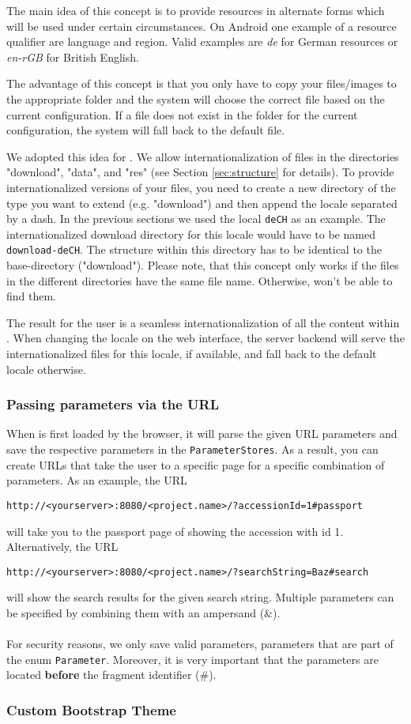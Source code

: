 The main idea of this concept is to provide resources in alternate forms which will be used under certain circumstances. On Android one example of a resource qualifier are language and region. Valid examples are \textit{de} for German resources or \textit{en-rGB} for British English.

The advantage of this concept is that you only have to copy your files/images to the appropriate folder and the system will choose the correct file based on the current configuration. If a file does not exist in the folder for the current configuration, the system will fall back to the default file.

We adopted this idea for {\germinate}. We allow internationalization of files in the directories "download", "data", and "res" (see Section \ref{sec:structure} for details). To provide internationalized versions of your files, you need to create a new directory of the type you want to extend (e.g. "download") and then append the locale separated by a dash. In the previous sections we used the local \texttt{de\textunderscore CH} as an example. The internationalized download directory for this locale would have to be named \texttt{download-de\textunderscore CH}. The structure within this directory has to be identical to the base-directory ("download"). Please note, that this concept only works if the files in the different directories have the same file name. Otherwise, {\germinate} won't be able to find them.

The result for the user is a seamless internationalization of all the content within {\germinate}. When changing the locale on the web interface, the server backend will serve the internationalized files for this locale, if available, and fall back to the default locale otherwise. 

\subsubsection{Passing parameters via the URL}
When {\germinate} is first loaded by the browser, it will parse the given URL parameters and save the respective parameters in the \texttt{ParameterStores}. As a result, you can create URLs that take the user to a specific page for a specific combination of parameters. As an example, the URL
\begin{center}
\texttt{http://<your\textunderscore server>:8080/<project.name>/?accessionId=1\#passport}
\end{center}
will take you to the passport page of {\germinate} showing the accession with id 1. Alternatively, the URL
\begin{center}
\texttt{http://<your\textunderscore server>:8080/<project.name>/?searchString=Baz\#search}
\end{center}
will show the search results for the given search string. Multiple parameters can be specified by combining them with an ampersand (\&).\\
\\
For security reasons, we only save valid parameters, \ie parameters that are part of the enum \texttt{Parameter}. Moreover, it is very important that the parameters are located \textbf{before} the fragment identifier (\#).


\subsubsection{Custom Bootstrap Theme}


